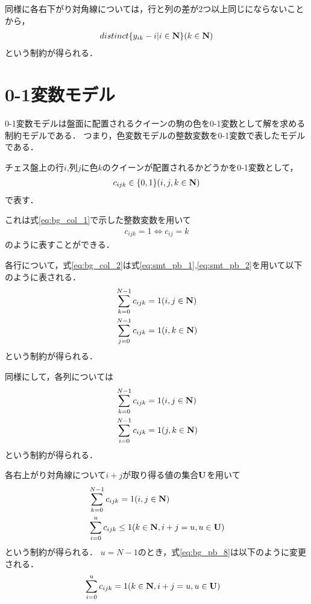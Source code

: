 同様に各右下がり対角線については，行と列の差が2つ以上同じにならないことから，
\begin{eqnarray}
    distinct\{y_{ik}-i | i \in {\bf N} \} (k \in {\bf N}) \label{eq:bg_pos_5}
\end{eqnarray}
という制約が得られる．


\section{0-1変数モデル}\label{sec:bg_pb}
0-1変数モデルは盤面に配置されるクイーンの駒の色を0-1変数として解を求める制約モデルである．
つまり，色変数モデルの整数変数を0-1変数で表したモデルである．

チェス盤上の行$i$,列$j$に色$k$のクイーンが配置されるかどうかを0-1変数として，
\begin{eqnarray}
    c_{ijk} \in \{0,1\} (i,j,k \in {\bf N}) \label{eq:bg_pb_1}
\end{eqnarray}
で表す．

これは式\ref{eq:bg_col_1}で示した整数変数を用いて
\begin{eqnarray}
    c_{ijk}=1 \Leftrightarrow c_{ij}=k \label{eq:bg_pb_2}
 \end{eqnarray}
のように表すことができる．

各行について，式\ref{eq:bg_col_2}は式\ref{eq:smt_pb_1},\ref{eq:smt_pb_2}を用いて以下のように表される．
\begin{eqnarray}
    & \sum_{k=0}^{N-1} c_{ijk} = 1     (i,j \in {\bf N}) \label{eq:bg_pb_3}\\
    & \sum_{j=0}^{N-1} c_{ijk} = 1     (i,k \in {\bf N}) \label{eq:bg_pb_4}
\end{eqnarray}
という制約が得られる．

同様にして，各列については
\begin{eqnarray}
    & \sum_{k=0}^{N-1} c_{ijk} = 1     (i,j \in {\bf N}) \label{eq:bg_pb_5}\\
    & \sum_{i=0}^{N-1} c_{ijk} = 1     (j,k \in {\bf N}) \label{eq:bg_pb_6}
\end{eqnarray}
という制約が得られる．

各右上がり対角線について$i+j$が取り得る値の集合$\bf U$を用いて
\begin{eqnarray}
    & \sum_{k=0}^{N-1} c_{ijk} = 1     (i,j \in {\bf N})    \label{eq:bg_pb_7}\\
    & \sum_{i=0}^{u} c_{ijk} \leq 1  (k \in {\bf N}, i+j=u, u \in {\bf U}) \label{eq:bg_pb_8}
\end{eqnarray}
という制約が得られる．
$u=N-1$のとき，式\ref{eq:bg_pb_8}は以下のように変更される．
\begin{eqnarray}
    & \sum_{i=0}^{u} c_{ijk} = 1  (k \in {\bf N}, i+j=u, u \in {\bf U}) \label{eq:bg_pb_9}
\end{eqnarray}


